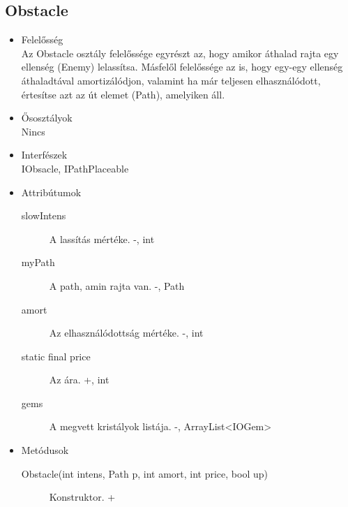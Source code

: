 \subsection{Obstacle}
\begin{itemize}
\item Felelősség\\
Az Obstacle osztály felelőssége egyrészt az, hogy amikor áthalad rajta egy ellenség (Enemy) lelassítsa. Másfelől felelőssége az is, hogy egy-egy ellenség  áthaladtával amortizálódjon, valamint ha már teljesen elhasználódott, értesítse azt az út elemet (Path), amelyiken áll.
\item Ősosztályok\\
Nincs
\item Interfészek\\
IObsacle, IPathPlaceable
\item Attribútumok\\
	\begin{description}
	\item[slowIntens] A lassítás mértéke. -, int
\item[myPath] A path, amin rajta van. -, Path
\item[amort] Az elhasználódottság mértéke. -, int
\item[static final price] Az ára. +, int
\item[gems] A megvett kristályok listája. -, ArrayList<IOGem> 


	\end{description}
\item Metódusok\\
	\begin{description}
		
		\item[Obstacle(int intens, Path p, int amort, int price, bool up)] Konstruktor. +
		
		
	\end{description}
\end{itemize}

